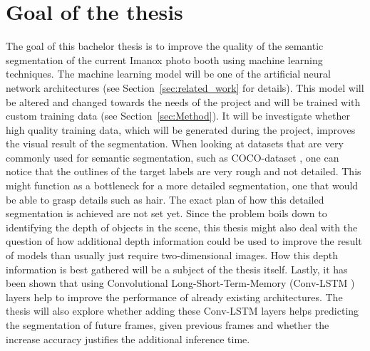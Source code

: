 \documentclass[11pt,
  paper=a4, 
  bibliography=totocnumbered,
	captions=tableheading,
	BCOR=10mm
]{scrreprt}
\theoremstyle{definition}
\begin{document}
\section{Goal of the thesis}
The goal of this bachelor thesis is to improve the quality of the semantic segmentation of the current Imanox photo booth using machine learning techniques.
The machine learning model will be one of the artificial neural network architectures (see Section~\ref{sec:related_work} for details).
This model will be altered and changed towards the needs of the project and will be trained with custom training data (see Section~\ref{sec:Method}).
It will be investigate whether high quality training data, which will be generated during the project, improves the visual result of the segmentation.
When looking at datasets that are very commonly used for semantic segmentation, such as COCO-dataset \cite{COCO2016}, one can notice that the outlines of the target labels are very rough and not detailed.
This might function as a bottleneck for a more detailed segmentation, one that would be able to grasp details such as hair.
The exact plan of how this detailed segmentation is achieved are not set yet.
Since the problem boils down to identifying the depth of objects in the scene, this thesis might also deal with the question of how additional depth information could be used to improve the result of models than usually just require two-dimensional images.
How this depth information is best gathered will be a subject of the thesis itself.
Lastly, it has been shown \cite{Nabavi2018, Pfeuffer2019} that using Convolutional Long-Short-Term-Memory (Conv-LSTM \cite{Shi2015}) layers help to improve the performance of already existing architectures.
The thesis will also explore whether adding these Conv-LSTM layers helps predicting the segmentation of future frames, given previous frames and whether the increase accuracy justifies the additional inference time.
\end{document}
